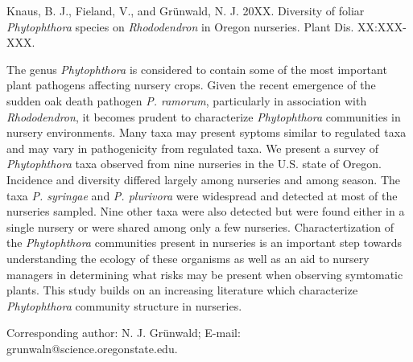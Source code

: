 \documentclass[12pt]{article}
\begin{document}
\begin{flushleft}
Knaus, B. J., Fieland, V., and Gr\"{u}nwald, N. J. 20XX. Diversity of foliar \textit{Phytophthora} species on \textit{Rhododendron} in Oregon nurseries. Plant Dis. XX:XXX-XXX.
\\

\hspace{12pt}


\linenumbers

The genus \emph{Phytophthora} is considered to contain some of the most important plant pathogens affecting nursery crops. Given the recent emergence of the sudden oak death pathogen \emph{P. ramorum}, particularly in association with \emph{Rhododendron}, it becomes prudent to characterize \emph{Phytophthora} communities in nursery environments.  Many taxa may present syptoms similar to regulated taxa and may vary in pathogenicity from regulated taxa.  We present a survey of \emph{Phytophthora} taxa observed from nine nurseries in the U.S. state of Oregon.  Incidence and diversity differed largely among nurseries and among season.  The taxa \emph{P. syringae} and \emph{P. plurivora} were widespread and detected at most of the nurseries sampled.  Nine other taxa were also detected but were found either in a single nursery or were shared among only a few nurseries.  Charactertization of the \emph{Phytophthora} communities present in nurseries is an important step towards understanding the ecology of these organisms as well as an aid to nursery managers in determining what risks may be present when observing symtomatic plants.  This study builds on an increasing literature which characterize \emph{Phytophthora} community structure in nurseries.


\hspace{12pt}

Corresponding author: N. J. Gr\"{u}nwald; E-mail: grunwaln@science.oregonstate.edu.

\end{flushleft}


\noindent\makebox[\linewidth]{\rule{\textwidth}{1pt}} 


\end{document}
